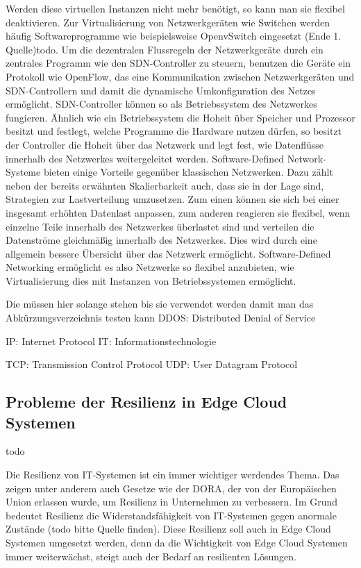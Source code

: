 Werden diese virtuellen Instanzen nicht mehr benötigt, so kann man sie flexibel deaktivieren. Zur Virtualisierung von Netzwerkgeräten wie Switchen werden häufig Softwareprogramme wie beispielsweise OpenvSwitch eingesetzt (Ende 1. Quelle)todo. 
Um die dezentralen Flussregeln der Netzwerkgeräte durch ein zentrales Programm wie den SDN-Controller zu steuern, benutzen die Geräte ein Protokoll wie OpenFlow, 
das eine Kommunikation zwischen Netzwerkgeräten und SDN-Controllern und damit die dynamische Umkonfiguration des Netzes ermöglicht. SDN-Controller können so als Betriebssystem des Netzwerkes fungieren. 
Ähnlich wie ein Betriebssystem die Hoheit über Speicher und Prozessor besitzt und festlegt, welche Programme die Hardware nutzen dürfen, so besitzt der Controller die Hoheit über das Netzwerk und legt fest, 
wie Datenflüsse innerhalb des Netzwerkes weitergeleitet werden. Software-Defined Network-Systeme bieten einige Vorteile gegenüber klassischen Netzwerken. Dazu zählt neben der bereits erwähnten Skalierbarkeit auch, 
dass sie in der Lage sind, Strategien zur Lastverteilung umzusetzen. Zum einen können sie sich bei einer insgesamt erhöhten Datenlast anpassen, zum anderen reagieren sie flexibel, 
wenn einzelne Teile innerhalb des Netzwerkes überlastet sind und verteilen die Datenströme gleichmäßig innerhalb des Netzwerkes. Dies wird durch eine allgemein bessere Übersicht über das Netzwerk ermöglicht. 
Software-Defined Networking ermöglicht es also Netzwerke so flexibel anzubieten, wie Virtualisierung dies mit Instanzen von Betriebssystemen ermöglicht.





Die müssen hier solange stehen bis sie verwendet werden damit man das Abkürzungsverzeichnis testen kann
\ac{DDOS}: Distributed Denial of Service

\ac{IP}: Internet Protocol
\ac{IT}: Informationstechnologie

\ac{TCP}: Transmission Control Protocol
\ac{UDP}: User Datagram Protocol


\subsection{Probleme der Resilienz in Edge Cloud Systemen}

todo

Die Resilienz von IT-Systemen ist ein immer wichtiger werdendes Thema. Das zeigen unter anderem auch Gesetze wie der \ac{DORA}, der von der Europäischen Union erlassen wurde, 
um Resilienz in Unternehmen zu verbessern. Im Grund bedeutet Resilienz die Widerstandsfähigkeit von IT-Systemen gegen anormale Zustände (todo bitte Quelle finden). 
Diese Resilienz soll auch in Edge Cloud Systemen umgesetzt werden, denn da die Wichtigkeit von Edge Cloud Systemen immer weiterwächst, steigt auch der Bedarf an resilienten Lösungen. 

